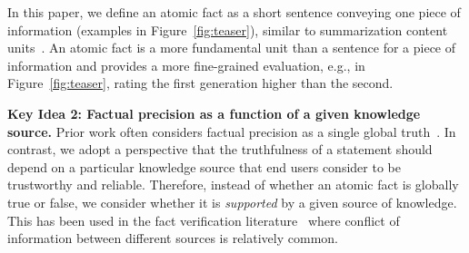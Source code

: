 In this paper, we define an atomic fact as a short sentence conveying one piece of information (examples in Figure~\ref{fig:teaser}), similar to summarization content units~\citep{nenkova2004evaluating}.
%
An atomic fact is a more fundamental unit than a sentence for a piece of information and provides a more fine-grained evaluation, e.g., in Figure~\ref{fig:teaser}, rating the first generation higher than the second.

\vspace{.3em}
\noindent
\textbf{Key Idea 2: Factual precision as a function of a given knowledge source.}
Prior work often considers factual precision as a single global truth~\citep{manakul2023selfcheckgpt}.
In contrast, we adopt a perspective that the truthfulness of a statement should depend on a particular knowledge source that end users consider to be trustworthy and reliable.
Therefore, instead of whether an atomic fact is globally true or false, we consider whether it is {\em supported} by a given source of knowledge.
This has been used in the fact verification literature~\citep{wadden2022scifact} where conflict of information between different sources is relatively common.

